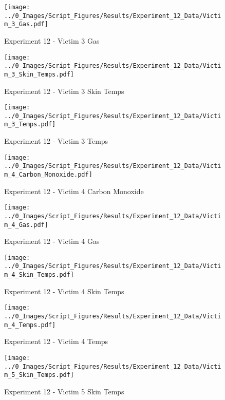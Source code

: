 	\begin{figure}[H]
		\centering
		\texttt{[image: ../0\_Images/Script\_Figures/Results/Experiment\_12\_Data/Victim\_3\_Gas.pdf]}
		\caption[]{Experiment 12 - Victim 3 Gas}
	\end{figure}
 
	\clearpage

	\begin{figure}[H]
		\centering
		\texttt{[image: ../0\_Images/Script\_Figures/Results/Experiment\_12\_Data/Victim\_3\_Skin\_Temps.pdf]}
		\caption[]{Experiment 12 - Victim 3 Skin Temps}
	\end{figure}
 

	\begin{figure}[H]
		\centering
		\texttt{[image: ../0\_Images/Script\_Figures/Results/Experiment\_12\_Data/Victim\_3\_Temps.pdf]}
		\caption[]{Experiment 12 - Victim 3 Temps}
	\end{figure}
 
	\clearpage

	\begin{figure}[H]
		\centering
		\texttt{[image: ../0\_Images/Script\_Figures/Results/Experiment\_12\_Data/Victim\_4\_Carbon\_Monoxide.pdf]}
		\caption[]{Experiment 12 - Victim 4 Carbon Monoxide}
	\end{figure}
 

	\begin{figure}[H]
		\centering
		\texttt{[image: ../0\_Images/Script\_Figures/Results/Experiment\_12\_Data/Victim\_4\_Gas.pdf]}
		\caption[]{Experiment 12 - Victim 4 Gas}
	\end{figure}
 
	\clearpage

	\begin{figure}[H]
		\centering
		\texttt{[image: ../0\_Images/Script\_Figures/Results/Experiment\_12\_Data/Victim\_4\_Skin\_Temps.pdf]}
		\caption[]{Experiment 12 - Victim 4 Skin Temps}
	\end{figure}
 

	\begin{figure}[H]
		\centering
		\texttt{[image: ../0\_Images/Script\_Figures/Results/Experiment\_12\_Data/Victim\_4\_Temps.pdf]}
		\caption[]{Experiment 12 - Victim 4 Temps}
	\end{figure}
 
	\clearpage

	\begin{figure}[H]
		\centering
		\texttt{[image: ../0\_Images/Script\_Figures/Results/Experiment\_12\_Data/Victim\_5\_Skin\_Temps.pdf]}
		\caption[]{Experiment 12 - Victim 5 Skin Temps}
	\end{figure}
 


